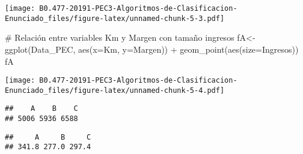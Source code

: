 \documentclass[]{article}
\newenvironment{Shaded}{\begin{snugshade}}{\end{snugshade}}
\newcommand{\KeywordTok}[1]{\textcolor[rgb]{0.94,0.87,0.69}{#1}}
\newcommand{\DataTypeTok}[1]{\textcolor[rgb]{0.87,0.87,0.75}{#1}}
\newcommand{\StringTok}[1]{\textcolor[rgb]{0.80,0.58,0.58}{#1}}
\newcommand{\CommentTok}[1]{\textcolor[rgb]{0.50,0.62,0.50}{#1}}
\newcommand{\OperatorTok}[1]{\textcolor[rgb]{0.94,0.94,0.82}{#1}}
\newcommand{\NormalTok}[1]{\textcolor[rgb]{0.80,0.80,0.80}{#1}}
\begin{document}
\texttt{[image: B0.477-20191-PEC3-Algoritmos-de-Clasificacion-Enunciado\_files/figure-latex/unnamed-chunk-5-3.pdf]}

\begin{Shaded}
\begin{Highlighting}[]
\CommentTok{# Relación entre variables Km y Margen con tamaño ingresos}
\NormalTok{fA<-}\KeywordTok{ggplot}\NormalTok{(Data_PEC, }\KeywordTok{aes}\NormalTok{(}\DataTypeTok{x=}\NormalTok{Km, }\DataTypeTok{y=}\NormalTok{Margen)) }\OperatorTok{+}\StringTok{ }\KeywordTok{geom_point}\NormalTok{(}\KeywordTok{aes}\NormalTok{(}\DataTypeTok{size=}\NormalTok{Ingresos))}
\NormalTok{fA}
\end{Highlighting}
\end{Shaded}

\texttt{[image: B0.477-20191-PEC3-Algoritmos-de-Clasificacion-Enunciado\_files/figure-latex/unnamed-chunk-5-4.pdf]}

\begin{Shaded}
\end{Shaded}

\begin{verbatim}
##    A    B    C 
## 5006 5936 6588
\end{verbatim}

\begin{Shaded}
\end{Shaded}

\begin{verbatim}
##     A     B     C 
## 341.8 277.0 297.4
\end{verbatim}

\begin{Shaded}
\end{Shaded}
\end{document}
